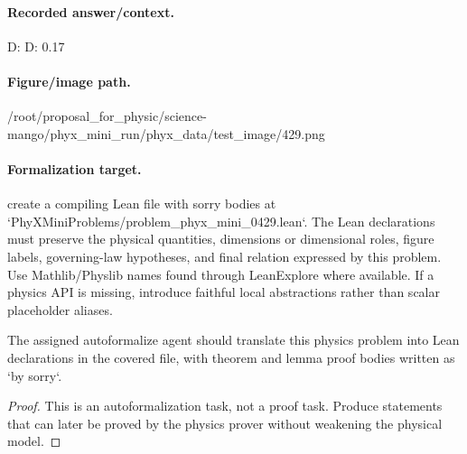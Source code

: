 \paragraph{Recorded answer/context.}
D: D: 0.17

\paragraph{Figure/image path.}
/root/proposal\_for\_physic/science-mango/phyx\_mini\_run/phyx\_data/test\_image/429.png

\paragraph{Formalization target.}
create a compiling Lean file with sorry bodies at `PhyXMiniProblems/problem\_phyx\_mini\_0429.lean`. The Lean declarations must preserve the physical quantities, dimensions or dimensional roles, figure labels, governing-law hypotheses, and final relation expressed by this problem.
Use Mathlib/Physlib names found through LeanExplore where available. If a physics API is missing, introduce faithful local abstractions rather than scalar placeholder aliases.

\begin{theorem}
\label{thm:physics:phyx_mini_0429:target}
The assigned autoformalize agent should translate this physics problem into Lean declarations in the covered file, with theorem and lemma proof bodies written as `by sorry`.
\end{theorem}
\begin{proof}
This is an autoformalization task, not a proof task. Produce statements that can later be proved by the physics prover without weakening the physical model.
\end{proof}

